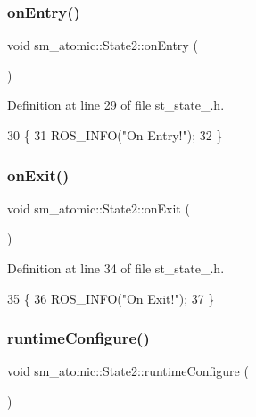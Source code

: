 \subsubsection{\texorpdfstring{on\+Entry()}{onEntry()}}
{\footnotesize\ttfamily void sm\+\_\+atomic\+::\+State2\+::on\+Entry (\begin{DoxyParamCaption}{ }\end{DoxyParamCaption})\hspace{0.3cm}{\ttfamily [inline]}}



Definition at line 29 of file st\+\_\+state\+\_.\+h.


\begin{DoxyCode}
30     \{
31         ROS\_INFO(\textcolor{stringliteral}{"On Entry!"});
32     \}
\end{DoxyCode}
\mbox{\label{structsm__atomic_1_1State2_ac6aed12a8e4fa53968de90ca540a59ff}} 
\subsubsection{\texorpdfstring{on\+Exit()}{onExit()}}
{\footnotesize\ttfamily void sm\+\_\+atomic\+::\+State2\+::on\+Exit (\begin{DoxyParamCaption}{ }\end{DoxyParamCaption})\hspace{0.3cm}{\ttfamily [inline]}}



Definition at line 34 of file st\+\_\+state\+\_.\+h.


\begin{DoxyCode}
35     \{
36         ROS\_INFO(\textcolor{stringliteral}{"On Exit!"});
37     \}
\end{DoxyCode}
\mbox{\label{structsm__atomic_1_1State2_afd749890e13d8aa36f1ac6645a5f7f9a}} 
\subsubsection{\texorpdfstring{runtime\+Configure()}{runtimeConfigure()}}
{\footnotesize\ttfamily void sm\+\_\+atomic\+::\+State2\+::runtime\+Configure (\begin{DoxyParamCaption}{ }\end{DoxyParamCaption})\hspace{0.3cm}{\ttfamily [inline]}}



